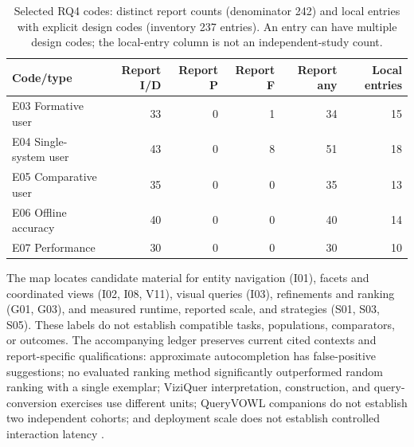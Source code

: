\documentclass[manuscript,review,screen]{acmart}
\begin{document}
\begin{table}[htbp]

\centering\small

\caption{Selected RQ4 codes: distinct report counts (denominator 242) and local entries with explicit design codes (inventory 237 entries). An entry can have multiple design codes; the local-entry column is not an independent-study count.}

\label{tab:retrospective-evaluation-scope}

\begin{tabular}{@{}lrrrrr@{}}

\toprule Code/type & Report I/D & Report P & Report F & Report any & Local entries\\\midrule

E03 Formative user & 33 & 0 & 1 & 34 & 15\\

E04 Single-system user & 43 & 0 & 8 & 51 & 18\\

E05 Comparative user & 35 & 0 & 0 & 35 & 13\\

E06 Offline accuracy & 40 & 0 & 0 & 40 & 14\\

E07 Performance & 30 & 0 & 0 & 30 & 10\\

\bottomrule\end{tabular}

\end{table}

The map locates candidate material for entity navigation (I01), facets and coordinated views (I02, I08, V11), visual queries (I03), refinements and ranking (G01, G03), and measured runtime, reported scale, and strategies (S01, S03, S05). These labels do not establish compatible tasks, populations, comparators, or outcomes. The accompanying ledger preserves current cited contexts and report-specific qualifications: approximate autocompletion has false-positive suggestions; no evaluated ranking method significantly outperformed random ranking with a single exemplar; ViziQuer interpretation, construction, and query-conversion exercises use different units; QueryVOWL companions do not establish two independent cohorts; and deployment scale does not establish controlled interaction latency \citep{2021_Parra_Fast_Approximate,2020_Lissandrini_Graph-Query_Suggestions,V3-01077,V3-01013,V3-02190,V3-02191,2022_Ikkala_Sampo-UI_A}.
\end{document}
